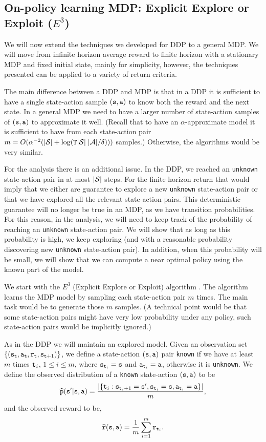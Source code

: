 \subsection{On-policy learning MDP: Explicit Explore or Exploit ($E^3$)}

We will now extend the techniques we developed for DDP to a general
MDP. We will move from infinite horizon average reward to finite
horizon with a stationary MDP and fixed initial state, mainly for simplicity, however, the techniques presented
can be applied to a variety of return criteria.

The main difference between a DDP and MDP is that in a DDP it is sufficient to have a single state-action sample $({\tt s},{\tt a})$ to know both the reward and the next state. In a general MDP we need to have a larger number of state-action samples of $({\tt s},{\tt a})$ to approximate it well. (Recall that to have an $\alpha$-approximate model it is sufficient to have from each state-action pair $m=O(\alpha^{-2}(|\mathcal{S}|+\log({\tt T} |\mathcal{S}|\;|\mathcal{A}|/\delta)))$ samples.)
Otherwise, the algorithms would be very similar.

For the analysis there is an additional issue. In the DDP, we reached an \texttt{unknown} state-action pair in at most $|\mathcal{S}|$ steps. For the finite horizon return that would imply that we either are guarantee to explore a new \texttt{unknown} state-action pair  or that we have explored all the relevant state-action pairs. This deterministic guarantee will no longer be true in an MDP, as we have transition probabilities. For this reason, in the analysis, we will need to keep track of the probability of reaching an \texttt{unknown} state-action pair. We will show that as long as this probability is high, we keep exploring (and with a reasonable probability discovering new \texttt{unknown} state-action pair). In addition, when this probability will be small, we will show that we can compute a near optimal policy using the known part of the model.

We start with the $E^3$ (Explicit Explore or Exploit) algorithm
\cite{KearnsS02}. The algorithm learns the MDP model by sampling
each state-action pair $m$ times. The main task would be to generate
those $m$ samples. (A technical point would be that some
state-action pairs might have very low probability under any
policy, such state-action pairs would be implicitly ignored.)

As in the DDP we will maintain an explored model. Given an
observation set $\{({\tt s}_{\tt t},{\tt a}_{\tt t} ,{\tt r}_{\tt t},
{\tt s}_{{\tt t}+1})\}$, we define a state-action $({\tt s},{\tt a})$
pair \texttt{known} if we have at least $m$ times ${\tt t}_i$, $1\leq i \leq m$,
where ${\tt s}_{{\tt t}_i}={\tt s}$ and ${\tt a}_{{\tt t}_i}={\tt a}$,
otherwise it is \texttt{unknown}. We define the observed distribution
of a \texttt{known} state-action $({\tt s},{\tt a})$ to be
\[
\widehat{{\tt p}}({\tt s}'|{\tt s},{\tt a})= \frac{|\{{\tt t}_i
:{\tt s}_{{\tt t}_i+1}={\tt s}',{\tt s}_{{\tt t}_i}={\tt s},{\tt a}_{{\tt t}_i}={\tt a}\}|}{m},
\]
and the observed reward to be,
\[
\widehat{{\tt r}}({\tt s},{\tt a})=\frac{1}{m}\sum_{i=1}^m
{\tt r}_{{\tt t}_i}.
\]


